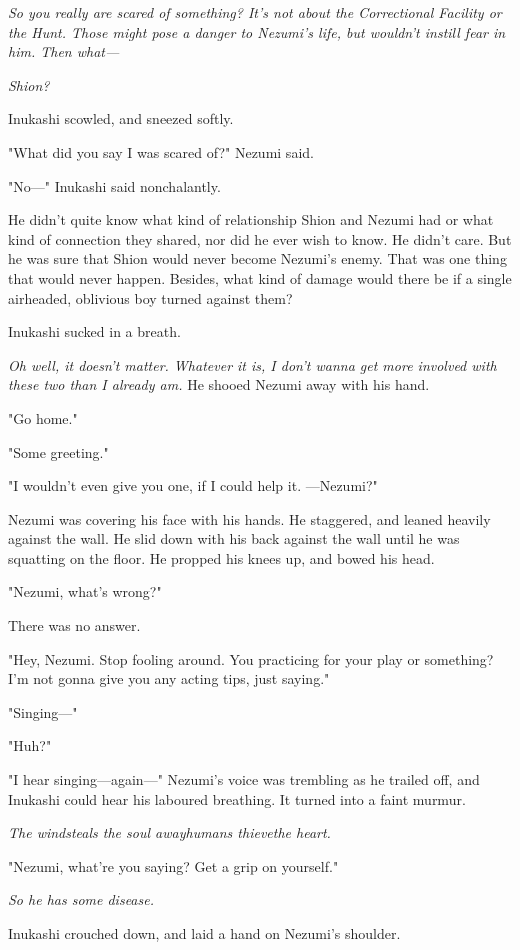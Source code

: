 \emph{So you really are scared of something? It's not about the Correctional
Facility or the Hunt. Those might pose a danger to Nezumi's life, but
wouldn't instill fear in him. Then what---}

\emph{Shion?}

Inukashi scowled, and sneezed softly.

"What did you say I was scared of?" Nezumi said.

"No---" Inukashi said nonchalantly.

He didn't quite know what kind of relationship Shion and Nezumi had or
what kind of connection they shared, nor did he ever wish to know. He
didn't care. But he was sure that Shion would never become Nezumi's
enemy. That was one thing that would never happen. Besides, what kind of
damage would there be if a single airheaded, oblivious boy turned
against them?

Inukashi sucked in a breath.

\emph{Oh well, it doesn't matter. Whatever it is, I don't wanna get more
involved with these two than I already am.} He shooed Nezumi away with
his hand.

"Go home."

"Some greeting."

"I wouldn't even give you one, if I could help it. ---Nezumi?"

Nezumi was covering his face with his hands. He staggered, and leaned
heavily against the wall. He slid down with his back against the wall
until he was squatting on the floor. He propped his knees up, and bowed
his head.

"Nezumi, what's wrong?"

There was no answer.

"Hey, Nezumi. Stop fooling around. You practicing for your play or
something? I'm not gonna give you any acting tips, just saying."

"Singing---"

"Huh?"

"I hear singing---again---" Nezumi's voice was trembling as he trailed off,
and Inukashi could hear his laboured breathing. It turned into a faint
murmur.

\emph{The wind\el steals the soul away\el humans thieve\el the heart.}

"Nezumi, what're you saying? Get a grip on yourself."

\emph{So he has some disease.}

Inukashi crouched down, and laid a hand on Nezumi's shoulder.


